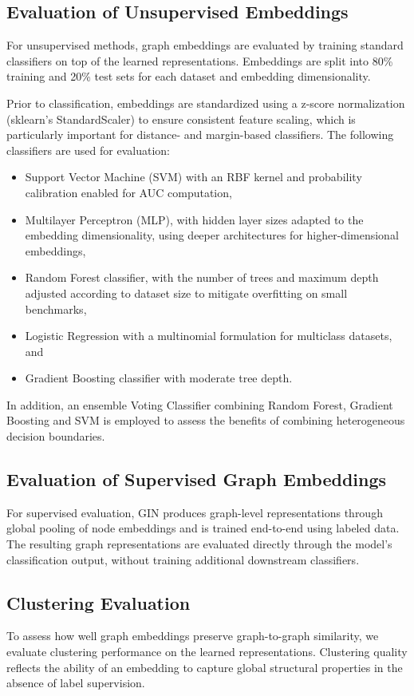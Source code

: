 \subsection{Evaluation of Unsupervised Embeddings}
For unsupervised methods, graph embeddings are evaluated by training standard
classifiers on top of the learned representations.
Embeddings are split into 80\% training and 20\% test sets for each dataset and
embedding dimensionality.

Prior to classification, embeddings are standardized using a z-score normalization (sklearn’s StandardScaler)
to ensure consistent feature scaling, which is particularly important for
distance- and margin-based classifiers.
The following classifiers are used for evaluation: 
\begin{itemize}
    \item Support Vector Machine (SVM) with an RBF kernel and probability calibration enabled for AUC computation,
    \item Multilayer Perceptron (MLP), with hidden layer sizes adapted to the embedding dimensionality, using deeper architectures for higher-dimensional embeddings,
    \item Random Forest classifier, with the number of trees and maximum depth adjusted according to dataset size to mitigate overfitting on small benchmarks,
    \item Logistic Regression with a multinomial formulation for multiclass datasets, and
    \item Gradient Boosting classifier with moderate tree depth.
\end{itemize}
In addition, an ensemble Voting Classifier combining Random Forest, Gradient Boosting and SVM is employed to assess the benefits of
combining heterogeneous decision boundaries.


\subsection{Evaluation of Supervised Graph Embeddings}
For supervised evaluation, GIN produces graph-level representations through
global pooling of node embeddings and is trained end-to-end using labeled data.
The resulting graph representations are evaluated directly through the model’s
classification output, without training additional downstream classifiers.


\subsection{Clustering Evaluation}
To assess how well graph embeddings preserve graph-to-graph similarity, we
evaluate clustering performance on the learned representations.
Clustering quality reflects the ability of an embedding to capture global
structural properties in the absence of label supervision.

